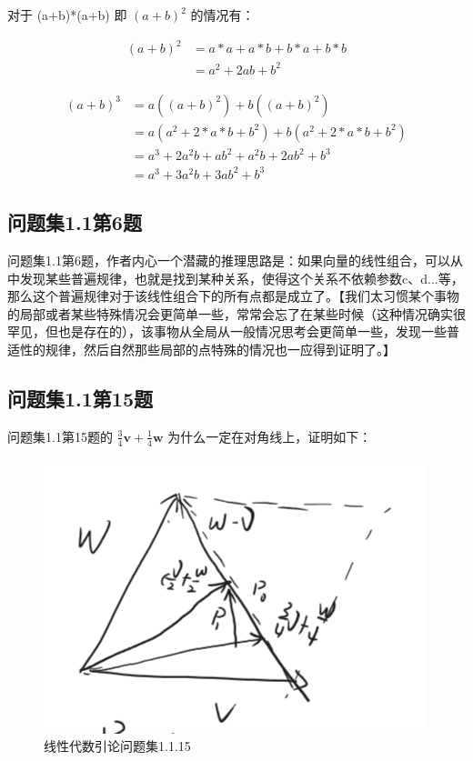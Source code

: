 \documentclass[12pt,oneside]{book}
\begin{document}
对于 (a+b)*(a+b) 即 $(a+b)^2$ 的情况有：

\begin{align*}
(a+b)^2 &= a*a + a*b + b*a + b*b\\
    &=a^2 + 2ab + b^2 
\end{align*}



\begin{align*}
(a+b)^3 &= a((a+b)^2) + b((a+b)^2)\\
    &=a(a^2 + 2 * a * b + b^2 )  + b(a^2 + 2 * a * b + b^2 )\\
    &=a^3 + 2a^2b + ab^2 + a^2b + 2ab^2 + b^3\\
    &=a^3 + 3a^2b + 3ab^2 + b^3
\end{align*}


\subsection{问题集1.1第6题}
\cite{线性代数引论}问题集1.1第6题，作者内心一个潜藏的推理思路是：如果向量的线性组合，可以从中发现某些普遍规律，也就是找到某种关系，使得这个关系不依赖参数c、d...等，那么这个普遍规律对于该线性组合下的所有点都是成立了。【我们太习惯某个事物的局部或者某些特殊情况会更简单一些，常常会忘了在某些时候（这种情况确实很罕见，但也是存在的），该事物从全局从一般情况思考会更简单一些，发现一些普适性的规律，然后自然那些局部的点特殊的情况也一应得到证明了。】

\subsection{问题集1.1第15题}
\cite{线性代数引论}问题集1.1第15题的 $\frac{3}{4}\boldsymbol{v} + \frac{1}{4}\boldsymbol{w}$ 为什么一定在对角线上，证明如下：

\begin{figure}[H]
\centering
\includegraphics[width=\linewidth ,totalheight=0.95\textheight , keepaspectratio]{线性代数引论问题集1_1_15.png}
\caption{线性代数引论问题集1.1.15}
\end{figure}
\end{document}
